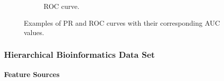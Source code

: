 \documentclass{beamer}
\begin{document}
\begin{frame}
\begin{figure}[!htb]
\begin{subfigure}[t]{0.5\textwidth}
            \caption{ROC curve.}
        \end{subfigure}
        \caption{Examples of PR and ROC curves with their corresponding AUC values.}
        \label{fig:PRRocExamples}
    \end{figure}
\end{frame}
\begin{frame}
    \frametitle{Hierarchical Bioinformatics Data Set}
    \framesubtitle{Feature Sources}
\end{frame}
\end{document}
